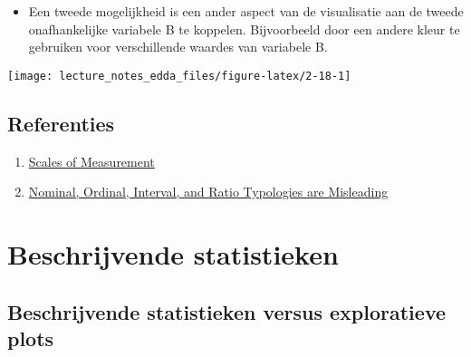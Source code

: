 \documentclass[]{memoir}
\providecommand{\tightlist}{%
  \setlength{\itemsep}{0pt}\setlength{\parskip}{0pt}}
\begin{document}
\begin{itemize}
\tightlist
\item
  Een tweede mogelijkheid is een ander aspect van de visualisatie aan de
  tweede onafhankelijke variabele B te koppelen. Bijvoorbeeld door een
  andere kleur te gebruiken voor verschillende waardes van variabele B.
\end{itemize}

\texttt{[image: lecture\_notes\_edda\_files/figure-latex/2-18-1]}

\section{Referenties}\label{referenties-1}

\begin{enumerate}
\def\labelenumi{\arabic{enumi}.}
\tightlist
\item
  \href{http://www.mnestudies.com/research/scales-measurement}{Scales of
  Measurement}
\item
  \href{http://websites.uwlax.edu/tbrooks/eco307/handouts/velleman\%201993\%20-\%20typologies\%20misleading.pdf}{Nominal,
  Ordinal, Interval, and Ratio Typologies are Misleading}
\end{enumerate}

\chapter{Beschrijvende statistieken}\label{beschrijvende-statistieken}

\section{Beschrijvende statistieken versus exploratieve
plots}\label{beschrijvende-statistieken-versus-exploratieve-plots}
\end{document}
